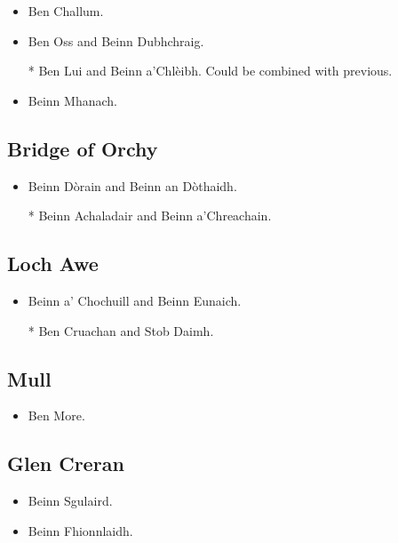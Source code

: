 \begin{itemize}
\item Ben Challum.

\item Ben Oss and Beinn Dubhchraig.

\item[*] Ben Lui and Beinn a'Chlèibh.  Could be combined with previous. 

\item Beinn Mhanach.
\end{itemize}


\subsection{Bridge of Orchy}

\begin{itemize}
\item Beinn Dòrain and Beinn an Dòthaidh.

\item[*] Beinn Achaladair and Beinn a'Chreachain.
\end{itemize}


\subsection{Loch Awe}

\begin{itemize}
\item Beinn a' Chochuill and Beinn Eunaich.

\item [*] Ben Cruachan and Stob Daimh.
\end{itemize}


\subsection{Mull}

\begin{itemize}
\item Ben More.
\end{itemize}


\subsection{Glen Creran}

\begin{itemize}
\item Beinn Sgulaird.

\item Beinn Fhionnlaidh.
\end{itemize}
